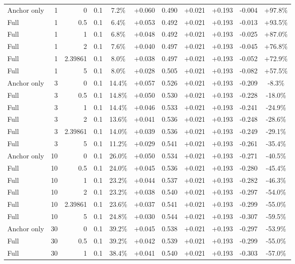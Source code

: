 \begin{table}[htbp]
\begin{tabular}{lrrrccccccc}
Anchor only & 1 & 0 & 0.1 & 7.2\% & +0.060 & 0.490 & +0.021 & +0.193 & -0.004 & +97.8\% \\
Full & 1 & 0.5 & 0.1 & 6.4\% & +0.053 & 0.492 & +0.021 & +0.193 & -0.013 & +93.5\% \\
Full & 1 & 1 & 0.1 & 6.8\% & +0.048 & 0.492 & +0.021 & +0.193 & -0.025 & +87.0\% \\
Full & 1 & 2 & 0.1 & 7.6\% & +0.040 & 0.497 & +0.021 & +0.193 & -0.045 & +76.8\% \\
Full & 1 & 2.39861 & 0.1 & 8.0\% & +0.038 & 0.497 & +0.021 & +0.193 & -0.052 & +72.9\% \\
Full & 1 & 5 & 0.1 & 8.0\% & +0.028 & 0.505 & +0.021 & +0.193 & -0.082 & +57.5\% \\
Anchor only & 3 & 0 & 0.1 & 14.4\% & +0.057 & 0.526 & +0.021 & +0.193 & -0.209 & -8.3\% \\
Full & 3 & 0.5 & 0.1 & 14.8\% & +0.050 & 0.530 & +0.021 & +0.193 & -0.228 & -18.0\% \\
Full & 3 & 1 & 0.1 & 14.4\% & +0.046 & 0.533 & +0.021 & +0.193 & -0.241 & -24.9\% \\
Full & 3 & 2 & 0.1 & 13.6\% & +0.041 & 0.536 & +0.021 & +0.193 & -0.248 & -28.6\% \\
Full & 3 & 2.39861 & 0.1 & 14.0\% & +0.039 & 0.536 & +0.021 & +0.193 & -0.249 & -29.1\% \\
Full & 3 & 5 & 0.1 & 11.2\% & +0.029 & 0.541 & +0.021 & +0.193 & -0.261 & -35.4\% \\
Anchor only & 10 & 0 & 0.1 & 26.0\% & +0.050 & 0.534 & +0.021 & +0.193 & -0.271 & -40.5\% \\
Full & 10 & 0.5 & 0.1 & 24.0\% & +0.045 & 0.536 & +0.021 & +0.193 & -0.280 & -45.4\% \\
Full & 10 & 1 & 0.1 & 23.2\% & +0.044 & 0.537 & +0.021 & +0.193 & -0.282 & -46.3\% \\
Full & 10 & 2 & 0.1 & 23.2\% & +0.038 & 0.540 & +0.021 & +0.193 & -0.297 & -54.0\% \\
Full & 10 & 2.39861 & 0.1 & 23.6\% & +0.037 & 0.541 & +0.021 & +0.193 & -0.299 & -55.0\% \\
Full & 10 & 5 & 0.1 & 24.8\% & +0.030 & 0.544 & +0.021 & +0.193 & -0.307 & -59.5\% \\
Anchor only & 30 & 0 & 0.1 & 39.2\% & +0.045 & 0.538 & +0.021 & +0.193 & -0.297 & -53.9\% \\
Full & 30 & 0.5 & 0.1 & 39.2\% & +0.042 & 0.539 & +0.021 & +0.193 & -0.299 & -55.0\% \\
Full & 30 & 1 & 0.1 & 38.4\% & +0.041 & 0.540 & +0.021 & +0.193 & -0.303 & -57.0\% \\

\end{tabular}
\end{table}
